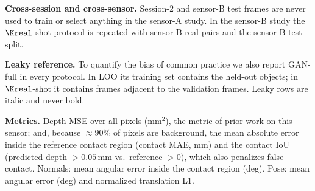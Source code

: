 \noindent\textbf{Cross-session and cross-sensor.} Session-2 and sensor-B test frames are never used to train or select anything in the sensor-A study. In the sensor-B study the $\Kreal$-shot protocol is repeated with sensor-B real pairs and the sensor-B test split.

\noindent\textbf{Leaky reference.} To quantify the bias of common practice we also report GAN-full in every protocol. In LOO its training set contains the held-out objects; in $\Kreal$-shot it contains frames adjacent to the validation frames. Leaky rows are italic and never bold.

\noindent\textbf{Metrics.} Depth MSE over all pixels ($\mathrm{mm}^2$), the metric of prior work on this sensor; and, because $\approx90\%$ of pixels are background, the mean absolute error inside the reference contact region (contact MAE, mm) and the contact IoU (predicted depth $>0.05\,$mm vs.\ reference $>0$), which also penalizes false contact. Normals: mean angular error inside the contact region (deg). Pose: mean angular error (deg) and normalized translation L1.
